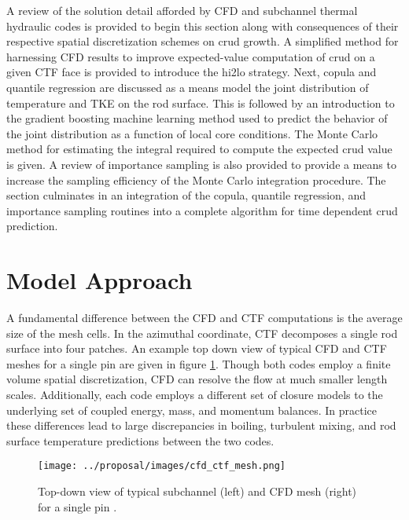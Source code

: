 
A review of the solution detail afforded by CFD and subchannel thermal hydraulic codes is provided to begin this section along with consequences of their respective spatial discretization schemes on crud growth.  A simplified method for harnessing CFD results to improve expected-value computation of crud on a given CTF face is provided to introduce the hi2lo strategy.  Next, copula and quantile regression are discussed as a means model the joint distribution of temperature and TKE on the rod surface.   This is followed by an introduction to the gradient boosting machine learning method used to predict the behavior of the joint distribution as a function of local core conditions.  The Monte Carlo method for estimating the integral required to compute the expected crud value is given.  A review of importance sampling is also provided to provide a means to increase the sampling efficiency of the Monte Carlo integration procedure.
The section culminates in an integration of the copula, quantile regression, and importance sampling routines into a complete algorithm for time dependent crud prediction.

\section{Model Approach}

A fundamental difference between the CFD and CTF computations is the average size of the mesh cells.  In the azimuthal coordinate, CTF decomposes a single rod surface into four patches.  An example top down view of typical CFD and CTF meshes for a single pin are given in figure \ref{fig:cfd_ctf_mesh}.  Though both codes employ a finite volume spatial discretization, CFD can resolve the flow at much smaller length scales.  Additionally, each code employs a different set of closure models to the underlying set of coupled energy, mass, and momentum balances.  In practice these differences lead to large discrepancies in boiling, turbulent mixing, and rod surface temperature predictions between the two codes.
  

\begin{figure}[!htbp]
    \centering
    \texttt{[image: ../proposal/images/cfd\_ctf\_mesh.png]}
    \caption[Top-down view of typical subchannel and CFD meshes]{Top-down view of typical subchannel (left) and CFD mesh (right) for a single pin \cite{salko12}.}
    \label{fig:cfd_ctf_mesh}
\end{figure}

